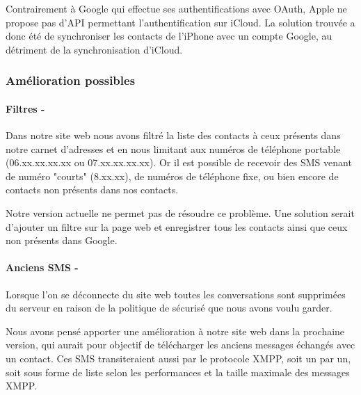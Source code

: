 Contrairement à Google qui effectue ses authentifications avec OAuth, Apple ne propose pas d'API permettant l'authentification sur iCloud.
La solution trouvée a donc été de synchroniser les contacts de l'iPhone avec un compte Google, au détriment de la synchronisation d'iCloud.
\\


\subsubsection{Amélioration possibles}

\paragraph{Filtres -}
Dans notre site web nous avons filtré la liste des contacts à ceux présents dans notre carnet d'adresses et en nous limitant aux numéros de téléphone portable (06.xx.xx.xx.xx ou 07.xx.xx.xx.xx).
Or il est possible de recevoir des SMS venant de numéro "courts" (8.xx.xx), de numéros de téléphone fixe, ou bien encore de contacts non présents dans nos contacts.

Notre version actuelle ne permet pas de résoudre ce problème.
Une solution serait d'ajouter un filtre sur la page web et enregistrer tous les contacts ainsi que ceux non présents dans Google.
\\


\paragraph{Anciens SMS -}
Lorsque l'on se déconnecte du site web toutes les conversations sont supprimées du serveur en raison de la politique de sécurisé que nous avons voulu garder.

Nous avons pensé apporter une amélioration à notre site web dans la prochaine version, qui aurait pour objectif de télécharger les anciens messages échangés avec un contact.
Ces SMS transiteraient aussi par le protocole XMPP, soit un par un, soit sous forme de liste selon les performances et la taille maximale des messages XMPP.
\\




